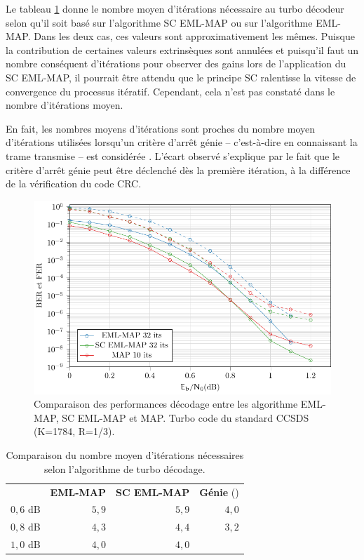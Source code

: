 Le tableau \ref{tab:itmoy} donne le nombre moyen d'itérations nécessaire au turbo décodeur selon qu'il soit basé sur 
l'algorithme SC EML-MAP ou sur l'algorithme EML-MAP. Dans les deux cas, ces valeurs sont approximativement les mêmes. 
Puisque la contribution de certaines valeurs extrinsèques sont annulées et puisqu'il faut un nombre conséquent d'itérations 
pour observer des gains lors de l'application du SC EML-MAP, il pourrait être attendu que le principe SC ralentisse la vitesse 
de convergence du processus itératif. Cependant, cela n'est pas constaté dans le nombre d'itérations moyen.

En fait, les nombres moyens d'itérations sont proches du nombre moyen d'itérations utilisées lorsqu'un critère d'arrêt 
génie -- c'est-à-dire en connaissant la trame transmise -- est considérée \cite{matache2000stopping}. L'écart observé 
s'explique par le fait que le critère d'arrêt génie peut être déclenché dès la première itération, à la différence de
la vérification du code CRC.

\begin{figure}[tb]
	\centering
	\includegraphics[width=.9\textwidth]{main/ch2_fig/tikz/ccsds_sc.pdf}
	\caption{\label{fig:ccsds_sc}Comparaison des performances décodage entre les algorithme EML-MAP, SC EML-MAP et MAP. Turbo code du standard CCSDS (K=1784, R=1/3).}
\end{figure}

\begin{table}[tb]
	\centering
	\renewcommand{\arraystretch}{.9}
	\begin{tabular}{lrrr}
		\toprule
		    & \textbf{EML-MAP} & \textbf{SC EML-MAP} & \textbf{Génie} (\cite{matache2000stopping})\\ 
		 \cmidrule(l){2-2} \cmidrule(l){3-3} \cmidrule(l){4-4} 
		$0,6$ dB & $5,9$ & $5,9$ & $4,0$\\
		$0,8$ dB & $4,3$ & $4,4$ & $3,2$\\
		$1,0$ dB & $4,0$ & $4,0$ & \\
		\bottomrule
	\end{tabular}
	\caption{Comparaison du nombre moyen d’itérations nécessaires selon l'algorithme de turbo décodage.}
	\label{tab:itmoy}
\end{table}

